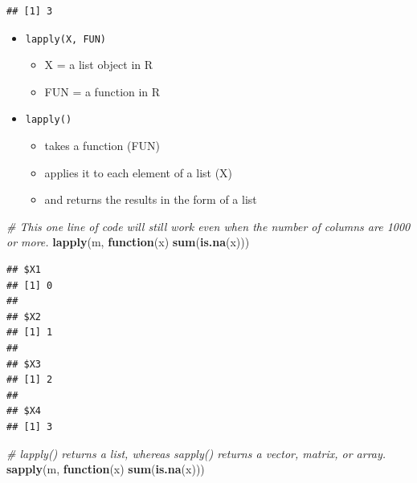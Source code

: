 \documentclass[]{book}
\newenvironment{Shaded}{\begin{snugshade}}{\end{snugshade}}
\newcommand{\CommentTok}[1]{\textcolor[rgb]{0.56,0.35,0.01}{\textit{#1}}}
\newcommand{\ControlFlowTok}[1]{\textcolor[rgb]{0.13,0.29,0.53}{\textbf{#1}}}
\newcommand{\KeywordTok}[1]{\textcolor[rgb]{0.13,0.29,0.53}{\textbf{#1}}}
\newcommand{\NormalTok}[1]{#1}
\newcommand{\OperatorTok}[1]{\textcolor[rgb]{0.81,0.36,0.00}{\textbf{#1}}}
\providecommand{\tightlist}{%
  \setlength{\itemsep}{0pt}\setlength{\parskip}{0pt}}
\begin{document}
\begin{Shaded}
\end{Shaded}

\begin{verbatim}
## [1] 3
\end{verbatim}

\begin{itemize}
\tightlist
\item
  \texttt{lapply(X,\ FUN)}

  \begin{itemize}
  \tightlist
  \item
    X = a list object in R
  \item
    FUN = a function in R
  \end{itemize}
\item
  \texttt{lapply()}

  \begin{itemize}
  \tightlist
  \item
    takes a function (FUN)
  \item
    applies it to each element of a list (X)
  \item
    and returns the results in the form of a list
  \end{itemize}
\end{itemize}

\begin{Shaded}
\begin{Highlighting}[]
\CommentTok{# This one line of code will still work even when the number of columns are 1000 or more. }
\KeywordTok{lapply}\NormalTok{(m, }\ControlFlowTok{function}\NormalTok{(x) }\KeywordTok{sum}\NormalTok{(}\KeywordTok{is.na}\NormalTok{(x)))}
\end{Highlighting}
\end{Shaded}

\begin{verbatim}
## $X1
## [1] 0
## 
## $X2
## [1] 1
## 
## $X3
## [1] 2
## 
## $X4
## [1] 3
\end{verbatim}

\begin{Shaded}
\begin{Highlighting}[]
\CommentTok{# lapply() returns a list, whereas sapply() returns a vector, matrix, or array. }
\KeywordTok{sapply}\NormalTok{(m, }\ControlFlowTok{function}\NormalTok{(x) }\KeywordTok{sum}\NormalTok{(}\KeywordTok{is.na}\NormalTok{(x)))}
\end{Highlighting}
\end{Shaded}
\end{document}
